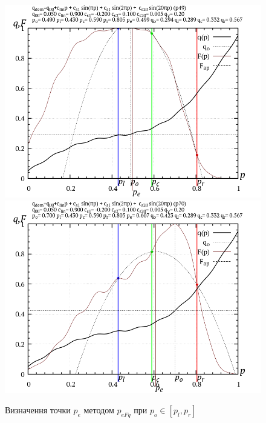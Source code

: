 \documentclass[a4paper,13pt]{atuaref}
\newlength\TW
\begin{document}
\begin{figure}[htb!]
  \centerline{
    \includegraphics[width=49\TW]{p3/p/p_eFq/q_p_eFq_p49.png}
    \hfill
    \includegraphics[width=49\TW]{p3/p/p_eFq/q_p_eFq_p70.png}
  }
  \caption{Визначення точки $ p_e $ методом $ p_{eFq} $ при $p_o \in [p_l, p_r] $}
  \label{atu:f:p_eFq_intra}
\end{figure}

\end{document}
